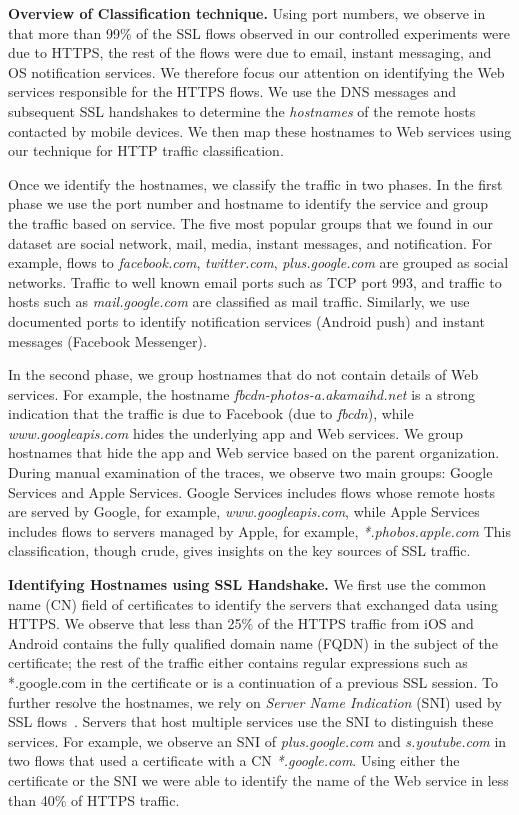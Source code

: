 \noindent\textbf{Overview of Classification technique.}
Using port numbers, we observe in that more than 99\% of the SSL flows observed in our controlled experiments were due to HTTPS, the rest of the flows were due to email, instant messaging, and OS notification services. 
We therefore focus our attention on identifying the Web services responsible for the HTTPS flows.
We use the DNS messages and subsequent SSL handshakes to determine the \emph{hostnames} of the remote hosts contacted by mobile devices.
We then map these hostnames to Web services using our technique for HTTP traffic classification.

Once we identify the hostnames, we classify the traffic in two phases.
In the first phase we use the port number and hostname to identify the service and group the traffic based on service.
The five most popular groups that we found in our dataset are social network, mail, media, instant messages, and notification.
For example, flows to \emph{facebook.com}, \emph{twitter.com}, \emph{plus.google.com} are grouped as social networks.
Traffic to well known email ports such as TCP port 993, and traffic to hosts such as \emph{mail.google.com} are classified as mail traffic.
Similarly, we use documented ports to identify notification services (Android push) and instant messages (Facebook Messenger).

In the second phase, we group hostnames that do not contain details of Web services.
For example, the hostname \emph{fbcdn-photos-a.akamaihd.net} is a strong indication that the traffic is due to Facebook (due to \emph{fbcdn}), while \emph{www.googleapis.com} hides the underlying app and Web services.
We group hostnames that hide the app and Web service based on the parent organization.
During manual examination of the traces, we observe two main groups: Google Services and Apple Services.
Google Services includes flows whose remote hosts are served by Google, for example, \emph{www.googleapis.com}, while Apple Services includes flows to servers managed by Apple, for example, \emph{*.phobos.apple.com}
This classification, though crude, gives insights on the key sources of SSL traffic.

\noindent\textbf{Identifying Hostnames using SSL Handshake.}
We first use the common name (CN) field of certificates to identify the servers that exchanged data using HTTPS.
We observe that less than 25\% of the HTTPS traffic from iOS and Android contains the fully qualified domain name (FQDN) in the subject of the certificate; the rest of the traffic either contains regular expressions such as *.google.com in the certificate or is a continuation of a previous SSL session. 
To further resolve the hostnames, we rely on \emph{Server Name Indication} (SNI) used by SSL flows~\cite{rfc:servernametls}.
Servers that host multiple services use the SNI to distinguish these services.   
For example, we observe an SNI of \emph{plus.google.com} and \emph{s.youtube.com} in two flows that used a certificate with a CN \emph{*.google.com}.
Using either the certificate or the SNI we were able to identify the name of the Web service in less than 40\% of HTTPS traffic.

